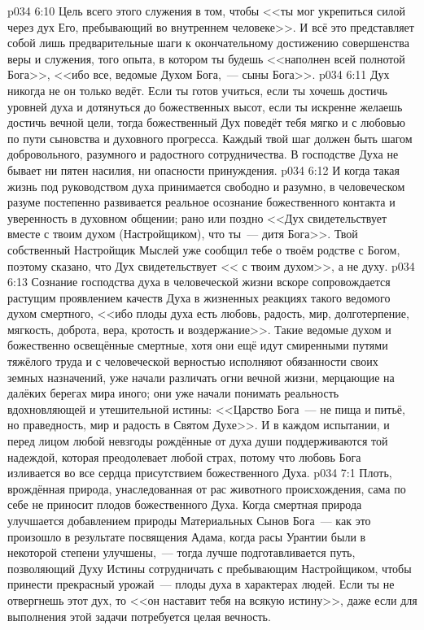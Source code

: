 \vs p034 6:10 Цель всего этого служения в том, чтобы <<ты мог укрепиться силой через дух Его, пребывающий во внутреннем человеке>>. И всё это представляет собой лишь предварительные шаги к окончательному достижению совершенства веры и служения, того опыта, в котором ты будешь <<наполнен всей полнотой Бога>>, <<ибо все, ведомые Духом Бога,~--- сыны Бога>>.
\vs p034 6:11 \pc Дух никогда не  он только ведёт. Если ты готов учиться, если ты хочешь достичь уровней духа и дотянуться до божественных высот, если ты искренне желаешь достичь вечной цели, тогда божественный Дух поведёт тебя мягко и с любовью по пути сыновства и духовного прогресса. Каждый твой шаг должен быть шагом добровольного, разумного и радостного сотрудничества. В господстве Духа не бывает ни пятен насилия, ни опасности принуждения.
\vs p034 6:12 И когда такая жизнь под руководством духа принимается свободно и разумно, в человеческом разуме постепенно развивается реальное осознание божественного контакта и уверенность в духовном общении; рано или поздно <<Дух свидетельствует вместе с твоим духом (Настройщиком), что ты~--- дитя Бога>>. Твой собственный Настройщик Мыслей уже сообщил тебе о твоём родстве с Богом, поэтому сказано, что Дух свидетельствует << с твоим духом>>, а не  духу.
\vs p034 6:13 Сознание господства духа в человеческой жизни вскоре сопровождается растущим проявлением качеств Духа в жизненных реакциях такого ведомого духом смертного, <<ибо плоды духа есть любовь, радость, мир, долготерпение, мягкость, доброта, вера, кротость и воздержание>>. Такие ведомые духом и божественно освещённые смертные, хотя они ещё идут смиренными путями тяжёлого труда и с человеческой верностью исполняют обязанности своих земных назначений, уже начали различать огни вечной жизни, мерцающие на далёких берегах мира иного; они уже начали понимать реальность вдохновляющей и утешительной истины: <<Царство Бога~--- не пища и питьё, но праведность, мир и радость в Святом Духе>>. И в каждом испытании, и перед лицом любой невзгоды рождённые от духа души поддерживаются той надеждой, которая преодолевает любой страх, потому что любовь Бога изливается во все сердца присутствием божественного Духа.
\vs p034 7:1 Плоть, врождённая природа, унаследованная от рас животного происхождения, сама по себе не приносит плодов божественного Духа. Когда смертная природа улучшается добавлением природы Материальных Сынов Бога~--- как это произошло в результате посвящения Адама, когда расы Урантии были в некоторой степени улучшены,~--- тогда лучше подготавливается путь, позволяющий Духу Истины сотрудничать с пребывающим Настройщиком, чтобы принести прекрасный урожай~--- плоды духа в характерах людей. Если ты не отвергнешь этот дух, то <<он наставит тебя на всякую истину>>, даже если для выполнения этой задачи потребуется целая вечность.
